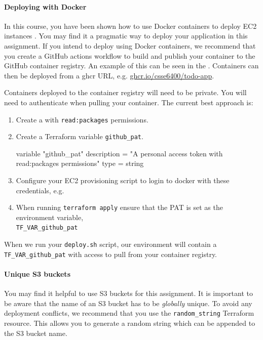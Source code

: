\documentclass{csse4400}
\begin{document}
\paragraph{Deploying with Docker}
In this course,
you have been shown how to use Docker containers to deploy EC2 instances \cite{prac-week5}.
You may find it a pragmatic way to deploy your application in this assignment.
If you intend to deploy using Docker containers,
we recommend that you create a GitHub actions workflow
to build and publish your container to the GitHub container registry.
An example of this can be seen in the .
Containers can then be deployed from a ghcr URL, e.g. \url{ghcr.io/csse6400/todo-app}.

Containers deployed to the container registry will need to be private.
You will need to authenticate when pulling your container.
The current best approach is:

\begin{enumerate}
  \item Create a  with \texttt{read:packages} permissions.
  \item Create a Terraform variable \texttt{github\_pat}.
\begin{code}[language=terraform]{}
variable "github_pat" {
    description = "A personal access token with read:packages permissions"
    type        = string
}
\end{code}
  \item Configure your EC2 provisioning script to login to docker with these credentials, e.g.
  \item When running \texttt{terraform apply} ensure that the PAT is set as the environment variable,\\
  \texttt{TF\_VAR\_github\_pat}
\end{enumerate}

When we run your \texttt{deploy.sh} script,
our environment will contain a \texttt{TF\_VAR\_github\_pat} with access to pull from your container registry.


\paragraph{Unique S3 buckets}
You may find it helpful to use S3 buckets for this assignment.
It is important to be aware that the name of an S3 bucket has to be \textsl{globally} unique.
To avoid any deployment conflicts,
we recommend that you use the \texttt{random\_string} Terraform resource.
This allows you to generate a random string which can be appended to the S3 bucket name.
\end{document}
